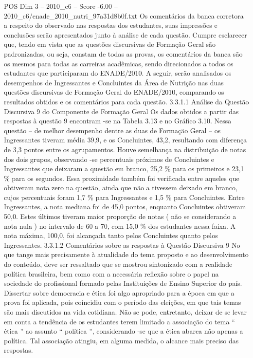 \begin{textsample}{POS Dim 3 – 2010\_c6 – Score -6.00 – 2010\_c6/enade\_2010\_nutri\_97a31d8b0f.txt}
Os comentários da banca corretora a respeito do observado nas respostas dos estudantes, suas impressões e conclusões serão apresentados junto à análise de cada questão.
Cumpre esclarecer que, tendo em vista que as questões discursivas de Formação Geral são padronizadas, ou seja, constam de todas as provas, os comentários da banca são os mesmos para todas as carreiras acadêmicas, sendo direcionados a todos os estudantes que participaram do ENADE/2010.
A seguir, serão analisados os desempenhos de Ingressantes e Concluintes da Área de Nutrição nas duas questões discursivas de Formação Geral do ENADE/2010, comparando os resultados obtidos e os comentários para cada questão. 3.3.1.1 Análise da Questão Discursiva 9 do Componente de Formação Geral Os dados obtidos a partir das respostas à questão 9 encontram -se na Tabela 3.13 e no Gráfico 3.10.
Nessa questão – de melhor desempenho dentre as duas de Formação Geral – os Ingressantes tiveram média 39,9, e os Concluintes, 43,2, resultando com diferença de 3,3 pontos entre os agrupamentos.
Houve semelhança na distribuição de notas dos dois grupos, observando -se percentuais próximos de Concluintes e Ingressantes que deixaram a questão em branco, 25,2 \% para os primeiros e 23,1 \% para os segundos.
Essa proximidade também foi verificada entre aqueles que obtiveram nota zero na questão, ainda que não a tivessem deixado em branco, cujos percentuais foram 1,7 \% para Ingressantes e 1,5 \% para Concluintes.
Entre Ingressantes, a nota mediana foi de 45,0 pontos, enquanto Concluintes obtiveram 50,0.
Estes últimos tiveram maior proporção de notas ( não se considerando a nota nula ) no intervalo de 60 a 70, com 15,0 \% dos estudantes nessa faixa.
A nota máxima, 100,0, foi alcançada tanto pelos Concluintes quanto pelos Ingressantes. 3.3.1.2 Comentários sobre as respostas à Questão Discursiva 9 No que tange mais precisamente à atualidade do tema proposto e ao desenvolvimento do conteúdo, deve ser ressaltado que se mostrou sintonizado com a realidade política brasileira, bem como com a necessária reflexão sobre o papel na sociedade do profissional formado pelas Instituições de Ensino Superior do país.
Dissertar sobre democracia e ética foi algo apropriado para a época em que a prova foi aplicada, pois coincidiu com o período das eleições, em que tais temas são mais discutidos na vida cotidiana.
Não se pode, entretanto, deixar de se levar em conta a tendência de os estudantes terem limitado a associação do tema “ ética ” ao assunto “ política ”, considerando -se que a ética abarca não apenas a política.
Tal associação atingiu, em alguma medida, o alcance mais preciso das respostas.

\end{textsample}
